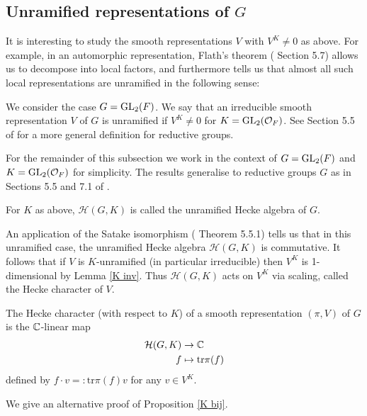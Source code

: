 \subsection{Unramified representations of $G$}


It is interesting to study the smooth representations $V$ with $V^K \neq 0$ as above. For example, in an automorphic representation, Flath's theorem (\cite{GH1} Section 5.7) allows us to decompose into local factors, and furthermore tells us that almost all such local representations are unramified in the following sense:

\begin{defn}
    We consider the case $G=\mathrm{GL}_2(F)$. We say that an irreducible smooth representation $V$ of $G$ is unramified if $V^K \neq 0$ for $K= \mathrm{GL}_2(\mathcal{O}_F)$. See Section 5.5 of \cite{GH1} for a more general definition for reductive groups.
\end{defn}

For the remainder of this subsection we work in the context of $G=\mathrm{GL}_2(F)$ and $K = \mathrm{GL}_2(\mathcal{O}_F)$ for simplicity. The results generalise to reductive groups $G$ as in Sections 5.5 and 7.1 of \cite{GH1}.
\begin{defn}
    For $K$ as above, $\mathcal H(G,K)$ is called the unramified Hecke algebra of $G$.
\end{defn}

An application of the Satake isomorphism (\cite{GH1} Theorem 5.5.1) tells us that in this unramified case, the unramified Hecke algebra $\mathcal H(G,K)$ is commutative. It follows that if $V$ is $K$-unramified (in particular irreducible) then $V^K$ is 1-dimensional by Lemma \ref{K inv}. Thus $\mathcal H(G,K)$ acts on $V^K$ via scaling, called the Hecke character of $V$.

\begin{defn}
    The Hecke character (with respect to $K$) of a smooth representation $(\pi,V)$ of $G$ is the $\mathbb{C}$-linear map
    \begin{equation*}
        \begin{split}
            \mathcal H(G,K) &\to \mathbb{C} \\
            f &\mapsto \mathrm{tr} \pi(f)
        \end{split}
    \end{equation*}
    defined by $f \cdot v =: \mathrm{tr}\pi(f) v $ for any $v \in V^K$.
\end{defn}

We give an alternative proof of Proposition \ref{K bij}.

